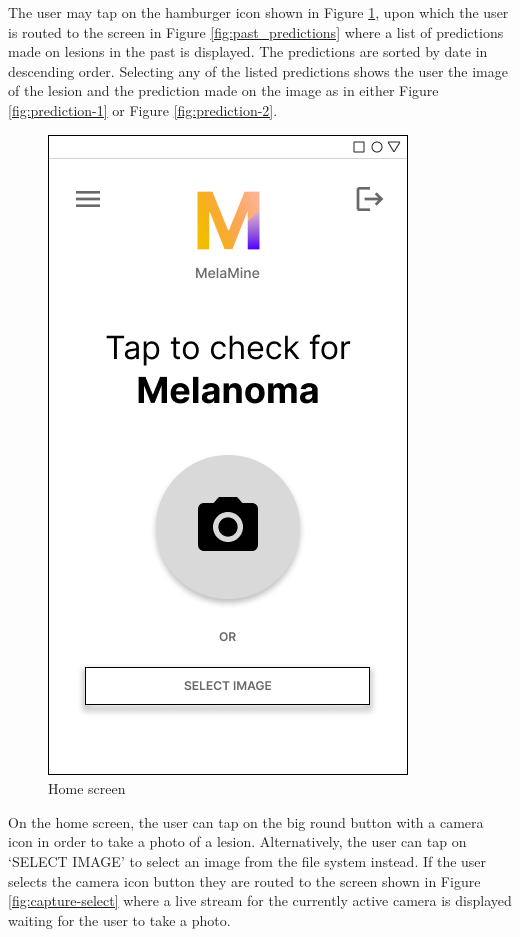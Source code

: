 \documentclass[12pt, a4paper]{article}
\begin{document}
The user may tap on the hamburger icon shown in Figure \ref{fig:home}, upon which the user is routed to the screen in Figure \ref{fig:past_predictions} where a list of predictions made on lesions in the past is displayed. The predictions are sorted by date in descending order. Selecting any of the listed predictions shows the user the image of the lesion and the prediction made on the image as in either Figure \ref{fig:prediction-1} or Figure \ref{fig:prediction-2}.
\begin{figure}[h]
    \centering
    \setlength{\fboxsep}{8pt}
    \includegraphics[scale=0.45, fbox]{Home.png}
    \caption{Home screen}
    \label{fig:home}
\end{figure}

On the home screen, the user can tap on the big round button with a camera icon in order to take a photo of a lesion. Alternatively, the user can tap on `SELECT IMAGE' to select an image from the file system instead. If the user selects the camera icon button they are routed to the screen shown in Figure \ref{fig:capture-select} where a live stream for the currently active camera is displayed waiting for the user to take a photo.
\end{document}
